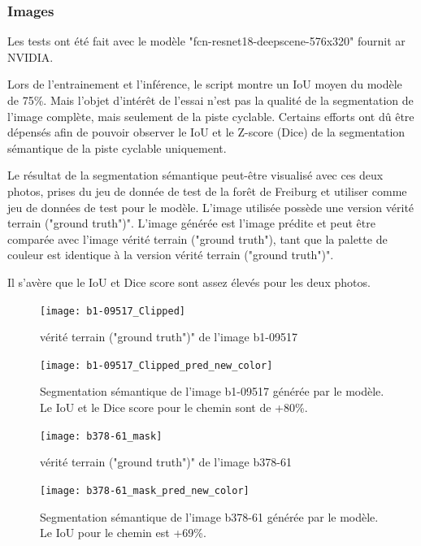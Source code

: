 \subsubsection{Images}
\par Les tests ont été fait avec le modèle "fcn-resnet18-deepscene-576x320" fournit ar NVIDIA. 
\par Lors de l'entrainement et l'inférence, le script montre un IoU moyen du modèle de 75\%. Mais l'objet d'intérêt de l'essai n'est pas la qualité de la segmentation de l'image complète, mais seulement de la piste cyclable. Certains efforts ont dû être dépensés afin de pouvoir observer le IoU et le Z-score (Dice) de la segmentation sémantique de la piste cyclable uniquement. 
\par Le résultat de la segmentation sémantique peut-être visualisé avec ces deux photos, prises du jeu de donnée de test de la forêt de Freiburg et utiliser comme jeu de données de test pour le modèle. L'image utilisée possède une version vérité terrain ("ground truth")". L'image générée est l'image prédite et peut être comparée avec l'image vérité terrain ("ground truth"), tant que la palette de couleur est identique à la version vérité terrain ("ground truth")". 
\par Il s'avère que le IoU et Dice score sont assez élevés pour les deux photos. 
\begin{figure}[H]
   \centering
   \texttt{[image: b1-09517\_Clipped]}
   \caption{vérité terrain ("ground truth")" de l'image b1-09517}
   \label{fig:b1-09517_Clipped}
\end{figure}
\begin{figure}[H]
   \centering
   \texttt{[image: b1-09517\_Clipped\_pred\_new\_color]}
   \caption{Segmentation sémantique de l'image b1-09517 générée par le modèle. Le IoU et le Dice score pour le chemin sont de +80\%.}
   \label{fig:b1-09517_Clipped_pred_new_color}
\end{figure}
\begin{figure}[H]
   \centering
   \texttt{[image: b378-61\_mask]}
   \caption{vérité terrain ("ground truth")" de l'image b378-61}
   \label{fig:b378-61_mask}
\end{figure}
\begin{figure}[H]
   \centering
   \texttt{[image: b378-61\_mask\_pred\_new\_color]}
   \caption{Segmentation sémantique de l'image b378-61 générée par le modèle. Le IoU pour le chemin est +69\%.}
   \label{fig:b378-61_mask_pred_new_color}
\end{figure}
